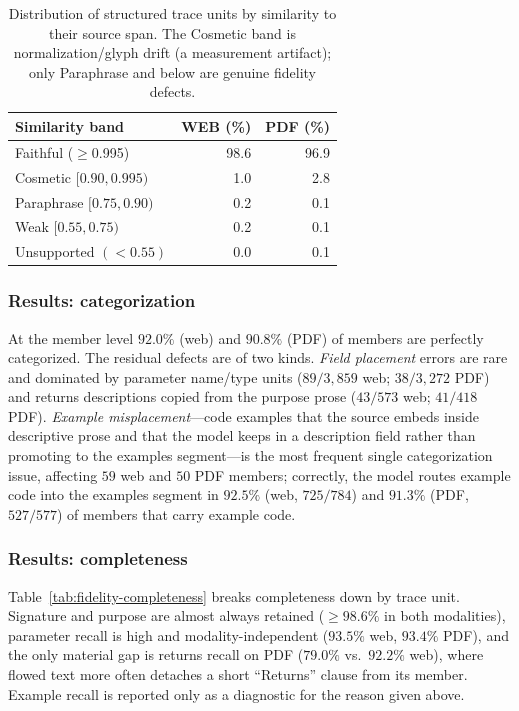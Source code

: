 \begin{table}[t]
\centering
\caption{Distribution of structured trace units by similarity to their source
span. The Cosmetic band is normalization/glyph drift (a measurement artifact);
only Paraphrase and below are genuine fidelity defects.}
\label{tab:fidelity-bands}
\begin{tabular}{lrr}
\toprule
Similarity band & WEB (\%) & PDF (\%) \\
\midrule
Faithful ($\geq$0.995)      & 98.6 & 96.9 \\
Cosmetic $[0.90,0.995)$     & 1.0  & 2.8  \\
Paraphrase $[0.75,0.90)$    & 0.2  & 0.1  \\
Weak $[0.55,0.75)$          & 0.2  & 0.1  \\
Unsupported $(<0.55)$       & 0.0  & 0.1  \\
\bottomrule
\end{tabular}
\end{table}

\subsubsection{Results: categorization}
At the member level $92.0\%$ (web) and $90.8\%$ (PDF) of members are perfectly
categorized. The residual defects are of two kinds. \emph{Field placement}
errors are rare and dominated by parameter name/type units
($89/3{,}859$ web; $38/3{,}272$ PDF) and returns descriptions copied from the
purpose prose ($43/573$ web; $41/418$ PDF). \emph{Example misplacement}---code
examples that the source embeds inside descriptive prose and that the model
keeps in a description field rather than promoting to the examples segment---is
the most frequent single categorization issue, affecting $59$ web and $50$ PDF
members; correctly, the model routes example code into the examples segment in
$92.5\%$ (web, $725/784$) and $91.3\%$ (PDF, $527/577$) of members that carry
example code.

\subsubsection{Results: completeness}
Table~\ref{tab:fidelity-completeness} breaks completeness down by trace unit.
Signature and purpose are almost always retained ($\geq 98.6\%$ in both
modalities), parameter recall is high and modality-independent
($93.5\%$ web, $93.4\%$ PDF), and the only material gap is returns recall on PDF
($79.0\%$ vs.\ $92.2\%$ web), where flowed text more often detaches a short
``Returns'' clause from its member. Example recall is reported only as a
diagnostic for the reason given above.

